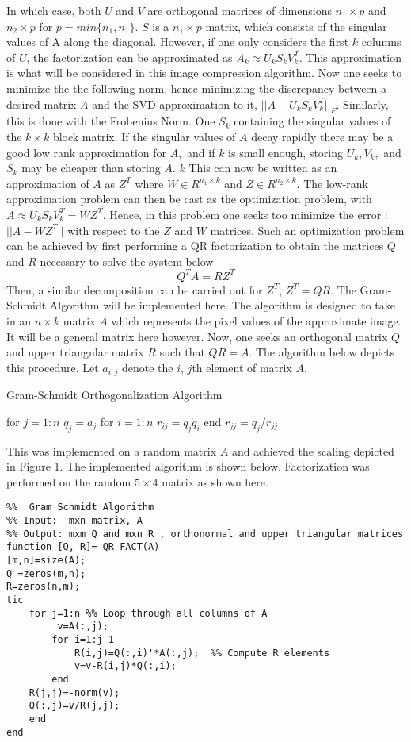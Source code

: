 \documentclass{article}
\begin{document}
In which case, both $U$ and $V$ are orthogonal matrices of dimensions $n_{1} \times p$ and  $n_{2} \times p$ for $p = min \{ n_{1}, n_{1} \} $. $S$ is a $n_{1} \times p$  matrix, which consists of the singular values of A along the diagonal.  However, if one only considers the first $k$ columns of $U$, the factorization can be approximated as  $A_{k} \approx U_{k}  S_{k}V_{k}^{T}$. This approximation is what will be considered in this image compression algorithm. Now one seeks to minimize the the following norm,  hence minimizing the discrepancy between a desired matrix $A$ and the SVD approximation to it, $||A -  U_{k}  S_{k}V_{k}^{T}||_{F}$. Similarly, this is done with the Frobenius Norm. One $S_{k}$  containing the singular values of the $k\times k$ block matrix. If the singular values of $A$ decay rapidly there may be a good low rank approximation for $A,$ and if $k$ is small enough, storing $U_k, V_k,$ and $S_k$ may be cheaper than storing $A.$ $k$  This can now be written as  an approximation of $A$ as $Z^T$ where $W\in R^{n_1\times k}$ and $Z\in R^{n_2\times k}.$ The low-rank approximation problem can then be cast as the optimization problem, with $A \approx  U_{k}  S_{k}V_{k}^{T} = WZ^T$. Hence, in this problem one seeks too minimize the error : $|| A - WZ^T||$ with respect to the $Z$ and $W$ matrices. Such an optimization problem can be achieved by first performing a QR factorization to obtain the matrices $Q$ and $R$ necessary to solve the system below 
$$ Q^{T} A =  RZ^{T}$$  
Then, a similar decomposition can be carried out for $Z^{T}$,  $Z^{T}=QR$.  The Gram-Schmidt Algorithm will be implemented here. The algorithm is designed to take in an $n \times k$ matrix $A$ which represents the pixel values  of the approximate image.  It will be a general matrix here however. Now, one seeks an orthogonal matrix  $Q$ and upper triangular matrix $R$ such that $QR =  A$. The algorithm below depicts this procedure. Let $a_{i,j}$ denote the $i$, $j$th element of matrix $A$. 
\begin{algorithm}
\caption{ Gram-Schmidt Orthogonalization Algorithm}
\label{alg:gs}
\begin{algorithmic}[1]
\State for $j=1:n$ 
\State $q_{j} = a_{j}$  
\State  for $i=1:n$ 
\State $r_{ij} = q_{j}\dot q_{i} $ 
 \State end 
 \State $r_{jj} = q_{j}/r_{jj}$  
\end{algorithmic}
\end{algorithm}



This was implemented on a random matrix $A$ and achieved the scaling depicted in Figure 1. The implemented algorithm is shown below. Factorization was performed on the random $5 \times 4$ matrix as shown here.  
\begin{lstlisting} 
%%  Gram Schmidt Algorithm 
%% Input:  mxn matrix, A 
%% Output: mxm Q and mxn R , orthonormal and upper triangular matrices 
function [Q, R]= QR_FACT(A)  
[m,n]=size(A); 
Q =zeros(m,n); 
R=zeros(n,m); 
tic
    for j=1:n %% Loop through all columns of A 
         v=A(:,j); 
        for i=1:j-1 
            R(i,j)=Q(:,i)'*A(:,j);  %% Compute R elements 
            v=v-R(i,j)*Q(:,i); 
        end 
    R(j,j)=-norm(v); 
    Q(:,j)=v/R(j,j);  
    end
end   
\end{lstlisting} 
\end{document}

